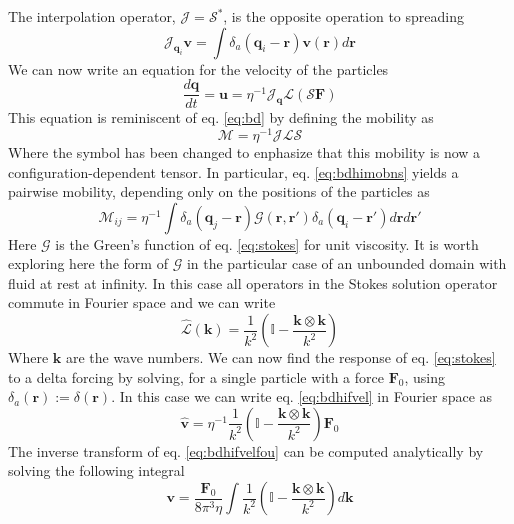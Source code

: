 \documentclass[ twoside,openright,titlepage,numbers=noenddot,%
headinclude,footinclude,cleardoublepage=empty,abstract=on,
BCOR=5mm,paper=a4,fontsize=11pt, dvipsnames
]{scrreprt}
\renewcommand{\vec}[1]{\bm{#1}}
\newcommand{\tens}[1]{\bm{\mathcal{#1}}}
\newcommand{\oper}[1]{\mathcal{#1}}
\newcommand{\ppos}{q}
\newcommand{\fpos}{r}
\newcommand{\fvel}{v}
\begin{document}
The interpolation operator, $\oper{J}=\oper{S}^*$, is the opposite operation to spreading
\begin{equation}
  \oper{J}_{\vec{\ppos}_i}\vec{\fvel} = \int{\delta_a(\vec{\ppos}_i - \vec{\fpos})\vec{\fvel}(\vec{\fpos})d\vec{\fpos}}
\end{equation}
We can now write an equation for the velocity of the particles
\begin{equation}
  \label{eq:bdhibdrelation}
  \frac{d\vec{q}}{dt} = \vec{u} = \eta^{-1}\oper{J}_{\vec{\ppos}}\oper{L}(\oper{S}\vec{F})
\end{equation}
This equation is reminiscent of eq. \eqref{eq:bd} by defining the mobility as
\begin{equation}
  \label{eq:bdhimobns}
  \tens{M} = \eta^{-1}\oper{J}\oper{L}\oper{S}
\end{equation}
Where the symbol has been changed to enphasize that this mobility is now a configuration-dependent tensor. In particular, eq. \eqref{eq:bdhimobns} yields a pairwise mobility, depending only on the positions of the particles as
\begin{equation}
  \label{eq:bdhimob}
  \tens{M}_{ij} = \eta^{-1}\int{\delta_a(\vec{q}_j-\vec{r})\tens{G}(\vec{r}, \vec{r}')\delta_a(\vec{q}_i -\vec{r}')d\vec{r}d\vec{r}'}
\end{equation}
Here $\tens{G}$ is the Green's function of eq. \eqref{eq:stokes} for unit viscosity.
It is worth exploring here the form of $\tens{G}$ in the particular case of an unbounded domain with fluid at rest at infinity. 
In this case all operators in the Stokes solution operator commute in Fourier space and we can write 
\begin{equation}
  \hat{\oper{L}}(\vec{k}) = \frac{1}{k^2}\left(\mathbb{I} - \frac{\vec{k}\otimes\vec{k}}{k^2}\right)
\end{equation}
Where $\vec{k}$ are the wave numbers.
We can now find the response of eq. \eqref{eq:stokes} to a delta forcing by solving, for a single particle with a force $\vec{F}_0$, using $\delta_a(\vec{r}) := \delta(\vec{r})$.
In this case we can write eq. \eqref{eq:bdhifvel} in Fourier space as
\begin{equation}
  \label{eq:bdhifvelfou}
  \hat{\vec{\fvel}} = \eta^{-1}\frac{1}{k^2}\left(\mathbb{I} - \frac{\vec{k}\otimes\vec{k}}{k^2}\right)\vec{F}_0
\end{equation}
The inverse transform of eq. \eqref{eq:bdhifvelfou} can be computed analytically by solving the following integral
\begin{equation}
  \vec{\fvel} = \frac{\vec{F}_0}{8\pi^3\eta}\int\frac{1}{k^2}\left(\mathbb{I} - \frac{\vec{k}\otimes\vec{k}}{k^2}\right)d\vec{k}
\end{equation}
\end{document}
